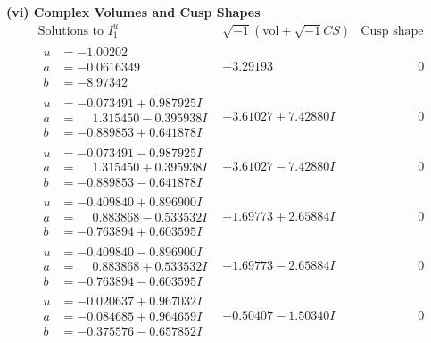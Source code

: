 \documentclass[1p]{elsarticle_modified}
\theoremstyle{definition}
\newcommand{\I}{\sqrt{-1}}
\begin{document}
\newpage\flushleft \textbf{(vi) Complex Volumes and Cusp Shapes}
$$\begin{array}{c|c|c}  
\text{Solutions to }I^u_{1}& \I (\text{vol} + \sqrt{-1}CS) & \text{Cusp shape}\\
 \hline 
\begin{aligned}
u &= -1.00202\phantom{ +0.000000I} \\
a &= -0.0616349\phantom{ +0.000000I} \\
b &= -8.97342\phantom{ +0.000000I}\end{aligned}
 & -3.29193\phantom{ +0.000000I} & \phantom{-0.000000 } 0 \\ \hline\begin{aligned}
u &= -0.073491 + 0.987925 I \\
a &= \phantom{-}1.315450 - 0.395938 I \\
b &= -0.889853 + 0.641878 I\end{aligned}
 & -3.61027 + 7.42880 I & \phantom{-0.000000 } 0 \\ \hline\begin{aligned}
u &= -0.073491 - 0.987925 I \\
a &= \phantom{-}1.315450 + 0.395938 I \\
b &= -0.889853 - 0.641878 I\end{aligned}
 & -3.61027 - 7.42880 I & \phantom{-0.000000 } 0 \\ \hline\begin{aligned}
u &= -0.409840 + 0.896900 I \\
a &= \phantom{-}0.883868 - 0.533532 I \\
b &= -0.763894 + 0.603595 I\end{aligned}
 & -1.69773 + 2.65884 I & \phantom{-0.000000 } 0 \\ \hline\begin{aligned}
u &= -0.409840 - 0.896900 I \\
a &= \phantom{-}0.883868 + 0.533532 I \\
b &= -0.763894 - 0.603595 I\end{aligned}
 & -1.69773 - 2.65884 I & \phantom{-0.000000 } 0 \\ \hline\begin{aligned}
u &= -0.020637 + 0.967032 I \\
a &= -0.084685 + 0.964659 I \\
b &= -0.375576 - 0.657852 I\end{aligned}
 & -0.50407 - 1.50340 I & \phantom{-0.000000 } 0 \\ \hline\begin{aligned}

\end{aligned}
\end{array}$$
\end{document}
